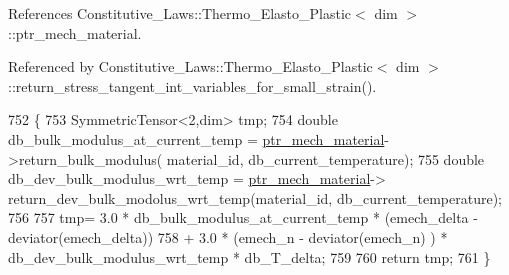 References Constitutive\+\_\+\+Laws\+::\+Thermo\+\_\+\+Elasto\+\_\+\+Plastic$<$ dim $>$\+::ptr\+\_\+mech\+\_\+material.



Referenced by Constitutive\+\_\+\+Laws\+::\+Thermo\+\_\+\+Elasto\+\_\+\+Plastic$<$ dim $>$\+::return\+\_\+stress\+\_\+tangent\+\_\+int\+\_\+variables\+\_\+for\+\_\+small\+\_\+strain().


\begin{DoxyCode}
752                                                                                                            
                 \{
753         SymmetricTensor<2,dim> tmp;
754         \textcolor{keywordtype}{double} db\_bulk\_modulus\_at\_current\_temp = \hyperlink{classConstitutive__Laws_1_1Thermo__Elasto__Plastic_a5a59fd71829d58859a122fe74628a9e4}{ptr\_mech\_material}->return\_bulk\_modulus(
      material\_id, db\_current\_temperature);
755         \textcolor{keywordtype}{double} db\_dev\_bulk\_modulus\_wrt\_temp = \hyperlink{classConstitutive__Laws_1_1Thermo__Elasto__Plastic_a5a59fd71829d58859a122fe74628a9e4}{ptr\_mech\_material}->
      return\_dev\_bulk\_modolus\_wrt\_temp(material\_id, db\_current\_temperature);
756 
757         tmp= 3.0 * db\_bulk\_modulus\_at\_current\_temp * (emech\_delta - deviator(emech\_delta))
758              + 3.0 * (emech\_n - deviator(emech\_n) ) * db\_dev\_bulk\_modulus\_wrt\_temp * db\_T\_delta;
759 
760         \textcolor{keywordflow}{return} tmp;
761     \}
\end{DoxyCode}
